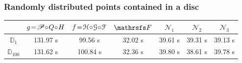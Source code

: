 \documentclass{beamer}
\begin{document}
\begin{frame}
\frametitle{Randomly distributed points contained in a disc}
\begin{table}[ht!]
\begin{center}
\begin{tabular}{c || c | c | c | c | c | c}
& $g\! =\! \P\!\circ\! Q \!\circ\! H$ & $f\!=\!\HH\!\circ\!\GG\!\circ\!\FF$ & $\FFF$ & $\mathcal{N}_1$ & $\mathcal{N}_2$ & $\mathcal{N}_3$ \\ \hline \hline
${\mathbb D}_1$ & 131.97 s & 99.56 s & 32.02 s  & 39.61 s & 39.31 s & 39.13 s \\ \hline
$\!{\mathbb D}_{100}\!$ & 131.62 s & 100.84 s & 32.36 s & 39.80 s& 38.61 s & 39.78 s \\
\end{tabular}
\end{center}
\end{table}


\end{frame}
\end{document}
